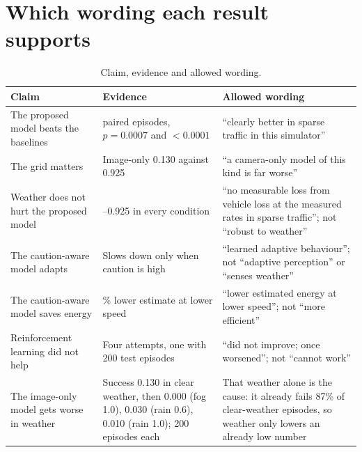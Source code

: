 \documentclass[11pt,a4paper]{article}
\begin{document}
\section{Which wording each result supports}\label{sec:wording}
\begin{table}[H]\centering\small
\caption{Claim, evidence and allowed wording.}\label{tab:wording}
\begin{tabularx}{\textwidth}{@{}>{\raggedright\arraybackslash}p{4.2cm}>{\raggedright\arraybackslash}p{4.4cm}X@{}}\toprule
Claim & Evidence & Allowed wording\\\midrule
The proposed model beats the baselines & 200 paired episodes, $p=0.0007$ and $<0.0001$ & ``clearly better in sparse traffic in this simulator''\\
The grid matters & Image-only 0.130 against 0.925 & ``a camera-only model of this kind is far worse''\\
Weather does not hurt the proposed model & 0.895--0.925 in every condition & ``no measurable loss from vehicle loss at the measured rates in sparse traffic''; not ``robust to weather''\\
The caution-aware model adapts & Slows down only when caution is high & ``learned adaptive behaviour''; not ``adaptive perception'' or ``senses weather''\\
The caution-aware model saves energy & 35\% lower estimate at lower speed & ``lower estimated energy at lower speed''; not ``more efficient''\\
Reinforcement learning did not help & Four attempts, one with 200 test episodes & ``did not improve; once worsened''; not ``cannot work''\\
The image-only model gets worse in weather & Success 0.130 in clear weather, then 0.000 (fog 1.0), 0.030 (rain 0.6), 0.010 (rain 1.0); 200 episodes each & That weather alone is the cause: it already fails 87\% of clear-weather episodes, so weather only lowers an already low number\\\bottomrule
\end{tabularx}
\end{table}
\end{document}
